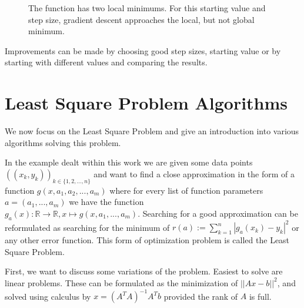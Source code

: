 \begin{figure}[h]
	\centering
	\caption{The function has two local minimums. For this starting value and step size, gradient descent approaches the local, but not global minimum.}
	\label{fig:grad_descent_global_min_not_found}
\end{figure}

Improvements can be made by choosing good step sizes, starting value or by starting with different values and comparing the results.

\section{Least Square Problem Algorithms}


We now focus on the Least Square Problem and give an introduction into various algorithms solving this problem.

In the example dealt within this work we are given some data points $((x_k, y_k))_{k \in \{1, 2, ..., n\}}$ and want to find a close approximation in the form of a function $g(x, a_1, a_2, ..., a_m)$ where for every list of function parameters $a = (a_1, ..., a_m)$ we have the function \\${g_a(x)\colon \mathds{R} \rightarrow \mathds{R}, x \mapsto g(x, a_1, ..., a_m)}$. Searching for a good approximation can be reformulated as searching for the minimum of $r(a) := \sum_{k=1}^{n} |g_a(x_k) - y_k|^2$ or any other error function. This form of optimization problem is called the Least Square Problem.

First, we want to discuss some variations of the problem. Easiest to solve are linear problems. These can be formulated as the minimization of $||Ax - b||^2$, and solved using calculus by $x=(A^TA)^{-1}A^Tb$ provided the rank of $A$ is full.

